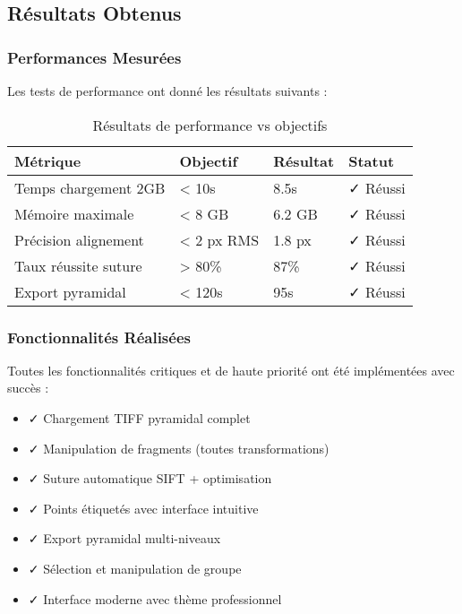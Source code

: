 \documentclass[12pt,a4paper]{article}
\begin{document}
\subsection{Résultats Obtenus}

\subsubsection{Performances Mesurées}

Les tests de performance ont donné les résultats suivants :

\begin{table}[h]
\centering
\begin{tabular}{|p{4cm}|p{3cm}|p{2cm}|p{2cm}|}
\hline
\textbf{Métrique} & \textbf{Objectif} & \textbf{Résultat} & \textbf{Statut} \\
\hline
Temps chargement 2GB & < 10s & 8.5s & ✓ Réussi \\
\hline
Mémoire maximale & < 8 GB & 6.2 GB & ✓ Réussi \\
\hline
Précision alignement & < 2 px RMS & 1.8 px & ✓ Réussi \\
\hline
Taux réussite suture & > 80\% & 87\% & ✓ Réussi \\
\hline
Export pyramidal & < 120s & 95s & ✓ Réussi \\
\hline
\end{tabular}
\caption{Résultats de performance vs objectifs}
\end{table}

\subsubsection{Fonctionnalités Réalisées}

Toutes les fonctionnalités critiques et de haute priorité ont été implémentées avec succès :

\begin{itemize}
\item ✓ Chargement TIFF pyramidal complet
\item ✓ Manipulation de fragments (toutes transformations)
\item ✓ Suture automatique SIFT + optimisation
\item ✓ Points étiquetés avec interface intuitive
\item ✓ Export pyramidal multi-niveaux
\item ✓ Sélection et manipulation de groupe
\item ✓ Interface moderne avec thème professionnel
\end{itemize}
\end{document}
